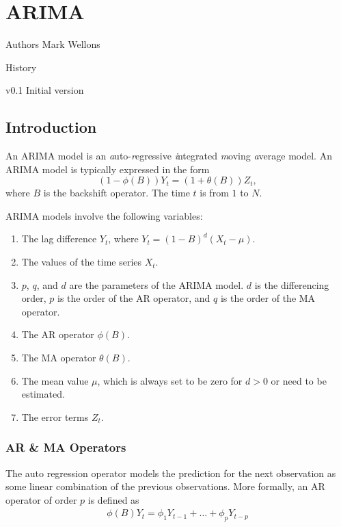 
\chapter[ARIMA]{ARIMA}
\begin{moduleinfo}
\item[Authors] {Mark Wellons}
\item[History]
	\begin{modulehistory}
    		\item[v0.1] Initial version
	\end{modulehistory}
\end{moduleinfo}

\section{Introduction}

An ARIMA model is an \textit{a}uto-\textit{r}egressive \textit{i}ntegrated
\textit{m}oving \textit{a}verage model.  An ARIMA model is typically expressed
in the form
\begin{equation}
(1 - \phi(B)) Y_t  = (1 + \theta(B)) Z_t,
\end{equation}
where $B$ is the backshift operator. The time $t$ is from $1$ to $N$.

ARIMA models involve the following variables:
\begin{enumerate}
   \item The lag difference $Y_{t}$, where  $Y_{t} = (1-B)^{d}(X_{t} - \mu)$.
    \item The values of the time series $X_t$.
    \item $p$, $q$, and $d$ are the parameters of the ARIMA model.
      $d$ is the differencing order, $p$ is the order of the AR
      operator, and $q$ is the order of the MA operator.
    \item The AR operator $\phi(B)$.
    \item The MA operator $\theta(B)$.
    \item The mean value $\mu$, which is always set to be zero for
      $d>0$ or need to be estimated.
    \item The error terms $Z_t$.
\end{enumerate}

\subsection{AR \& MA Operators}
The  auto regression operator models the prediction for the next
observation  as some linear combination of the previous observations.
More formally, an AR operator of order $p$ is defined as
\begin{align}
\phi(B) Y_t= \phi_1 Y_{t-1}   + \dots +  \phi_{p} Y_{t-p}
\end{align}

